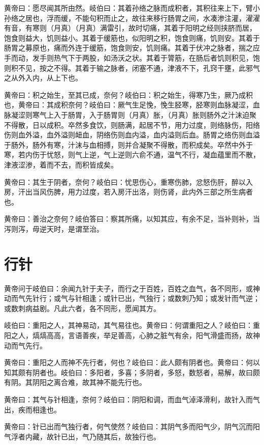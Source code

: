 \documentclass[12pt,UTF8]{ctexbook}
\begin{document}
	黄帝曰：愿尽闻其所由然。岐伯曰：其着孙络之脉而成积者，其积往来上下，臂小孙络之居也，浮而缓，不能句积而止之，故往来移行肠胃之间，水凑渗注灌，濯濯有音，有寒则（月真）（月真）满雷引，故时切痛，其着于阳明之经则挟脐而居，饱食则益大，饥则益小。其着于缓筋也，似阳明之积，饱食则痛，饥则安。其着于肠胃之募原也，痛而外连于缓筋，饱食则安，饥则痛。其着于伏冲之脉者，揣之应手而动，发手则热气下于两股，如汤沃之状。其着于膂筋，在肠后者饥则积见，饱则积不见，按之不得。其着于输之脉者，闭塞不通，津液不下，孔窍干壅，此邪气之从外入内，从上下也。
	
	黄帝曰：积之始生，至其已成，奈何？岐伯曰：积之始生，得寒乃生，厥乃成积也，黄帝曰：其成积奈何？岐伯曰：厥气生足悗，悗生胫寒，胫寒则血脉凝涩，血脉凝涩则寒气上入于肠胃，入于肠胃则（月真）胀，（月真）胀则肠外之汁沫迫聚不得散，日以成积。卒然多食饮，则肠满，起居不节，用力过度，则络脉伤，阳络伤则血外溢，血外溢则衄血，阴络伤则血内溢，血内溢则后血。肠胃之络伤则血溢于肠外，肠外有寒，汁沫与血相搏，则并合凝聚不得散，而积成矣。卒然中外于寒，若内伤于忧怒，则气上逆，气上逆则六俞不通，温气不行，凝血蕴里而不散，津液涩渗，着而不去，而积皆成矣。
	
	黄帝曰：其生于阴者，奈何？岐伯曰：忧思伤心，重寒伤肺，忿怒伤肝，醉以入房，汗出当风伤脾，用力过度，若入房汗出洛，则伤肾，此内外三部之所生病者也。
	
	黄帝曰：善治之奈何？岐伯答曰：察其所痛，以知其应，有余不足，当补则补，当泻则泻，毋逆天时，是谓至治。
	
	\chapter{行针}
	
	黄帝问于岐伯曰：余闻九针于夫子，而行之于百姓，百姓之血气，各不同形，或神动而气先针行；或气与针相逢；或针已出，气独行；或数刺乃知；或发针而气逆；或数刺病益剧。凡此六者，各不同形，愿闻其方。
	
	岐伯曰：重阳之人，其神易动，其气易往也。黄帝曰：何谓重阳之人？岐伯曰：重阳之人，熇熇高高，言语善疾，举足善高，心肺之脏气有余，阳气滑盛而扬，故神动而气先行。
	
	黄帝曰：重阳之人而神不先行者，何也？岐伯曰：此人颇有阴者也。黄帝曰：何以知其颇有阴者也。岐伯曰：多阳者，多喜；多阴者，多怒，数怒者，易解，故曰颇有阴。其阴阳之离合难，故其神不能先行也。
	
	黄帝曰：其气与针相逢，奈何？岐伯曰：阴阳和调，而血气淖泽滑利，故针入而气出，疾而相逢也。
	
	黄帝曰：针已出而气独行者，何气使然？岐伯曰：其阴气多而阳气少，阴气沉而阳气浮者内藏，故针已出，气乃随其后，故独行也。
	
\end{document}
